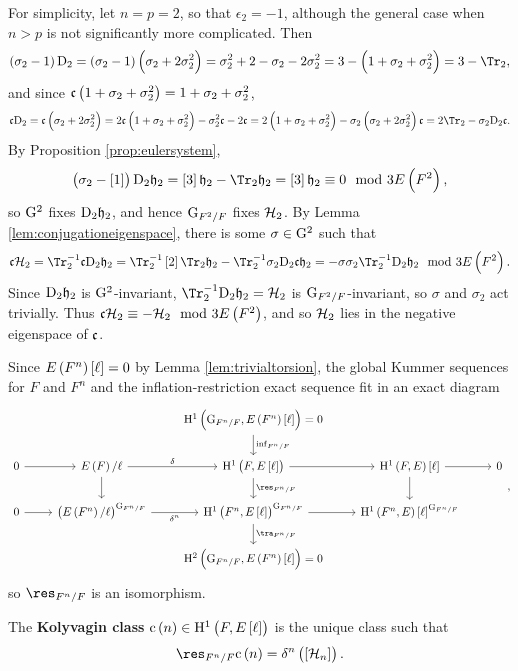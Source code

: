 \begin{example}
For simplicity, let $ n = p = 2 $, so that $ \epsilon_2 = -1 $, although the general case when $ n > p $ is not significantly more complicated. Then
$$ \br{\sigma_2 - 1}\D_2 = \br{\sigma_2 - 1}\br{\sigma_2 + 2\sigma_2^2} = \sigma_2^2 + 2 - \sigma_2 - 2\sigma_2^2 = 3 - \br{1 + \sigma_2 + \sigma_2^2} = 3 - \Tr_2, $$
and since $ \ccc\br{1 + \sigma_2 + \sigma_2^2} = 1 + \sigma_2 + \sigma_2^2 $,
$$ \ccc\D_2 = \ccc\br{\sigma_2 + 2\sigma_2^2} = 2\ccc\br{1 + \sigma_2 + \sigma_2^2} - \sigma_2^2\ccc - 2\ccc = 2\br{1 + \sigma_2 + \sigma_2^2} - \sigma_2\br{\sigma_2 + 2\sigma_2^2}\ccc = 2\Tr_2 - \sigma_2\D_2\ccc. $$
By Proposition \ref{prop:eulersystem},
$$ \br{\sigma_2 - \sbr{1}}\D_2 \hhh_2 = \sbr{3} \hhh_2 - \Tr_2 \hhh_2 = \sbr{3} \hhh_2 \equiv 0 \mod 3E\br{F^2}, $$
so $ \mathrm{G}^2 $ fixes $ \mathrm{D}_2 \mathfrak{h}_2 $, and hence $ \mathrm{G}_{F^2 / F} $ fixes $ \mathcal{H}_2 $. By Lemma \ref{lem:conjugationeigenspace}, there is some $ \sigma \in \mathrm{G}^2 $ such that
$$ \ccc \HHH_2 = \Tr_2^{-1}\ccc\D_2 \hhh_2 = \Tr_2^{-1}\sbr{2}\Tr_2 \hhh_2 - \Tr_2^{-1}\sigma_2\D_2\ccc \hhh_2 = -\sigma\sigma_2\Tr_2^{-1}\D_2 \hhh_2 \mod 3E\br{F^2}. $$
Since $ \mathrm{D}_2 \mathfrak{h}_2 $ is $ \mathrm{G}^2 $-invariant, $ \Tr_2^{-1}\D_2 \hhh_2 = \HHH_2 $ is $ \mathrm{G}_{F^2 / F} $-invariant, so $ \sigma $ and $ \sigma_2 $ act trivially. Thus $ \ccc \HHH_2 \equiv -\HHH_2 \mod 3E\br{F^2} $, and so $ \mathcal{H}_2 $ lies in the negative eigenspace of $ \mathfrak{c} $.
\end{example}

Since $ E\br{F^n}\sbr{\ell} = 0 $ by Lemma \ref{lem:trivialtorsion}, the global Kummer sequences for $ F $ and $ F^n $ and the inflation-restriction exact sequence fit in an exact diagram
$$
\begin{tikzcd}
& & \H^1\br{\G_{F^n / F}, E\br{F^n}\sbr{\ell}} = 0 \arrow{d}{\inf_{F^n / F}} & & \\
0 \arrow{r} & E\br{F} / \ell \arrow{r}{\delta} \arrow{d} & \H^1\br{F, E\sbr{\ell}} \arrow{r} \arrow{d}{\res_{F^n / F}} & \H^1\br{F, E}\sbr{\ell} \arrow{r} \arrow{d} & 0 \\
0 \arrow{r} & \br{E\br{F^n} / \ell}^{\G_{F^n / F}} \arrow{r}[swap]{\delta^n} & \H^1\br{F^n, E\sbr{\ell}}^{\G_{F^n / F}} \arrow{r} \arrow{d}{\tra_{F^n / F}} & \H^1\br{F^n, E}\sbr{\ell}^{\G_{F^n / F}} & \\
& & \H^2\br{\G_{F^n / F}, E\br{F^n}\sbr{\ell}} = 0 & &
\end{tikzcd},
$$
so $ \res_{F^n / F} $ is an isomorphism.

\begin{definition}
The \textbf{Kolyvagin class} $ \c\br{n} \in \H^1\br{F, E\sbr{\ell}} $ is the unique class such that
$$ \res_{F^n / F} \c\br{n} = \delta^n\br{\sbr{\HHH_n}}. $$
\end{definition}

